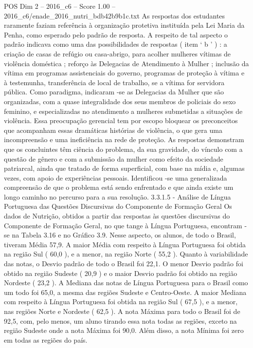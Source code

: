 \begin{textsample}{POS Dim 2 – 2016\_c6 – Score 1.00 – 2016\_c6/enade\_2016\_nutri\_bdb42b9b1c.txt}
As respostas dos estudantes raramente faziam referência à organização protetiva instituída pela Lei Maria da Penha, como esperado pelo padrão de resposta.
A respeito de tal aspecto o padrão indicava como uma das possibilidades de respostas ( item ‘ b ’ ) : a criação de casas de refúgio ou casa-abrigo, para acolher mulheres vítimas de violência doméstica ; reforço às Delegacias de Atendimento à Mulher ; inclusão da vítima em programas assistenciais do governo, programas de proteção à vítima e à testemunha, transferência de local de trabalho, se a vítima for servidora pública.
Como paradigma, indicaram -se as Delegacias da Mulher que são organizadas, com a quase integralidade dos seus membros de policiais do sexo feminino, e especializadas no atendimento a mulheres submetidas a situações de violência.
Essa preocupação gerencial tem por escopo bloquear os preconceitos que acompanham essas dramáticas histórias de violência, o que gera uma incompreensão e uma ineficiência na rede de proteção.
As respostas demonstram que os concluintes têm ciência do problema, da sua gravidade, do vínculo com a questão de gênero e com a submissão da mulher como efeito da sociedade patriarcal, ainda que tratado de forma superficial, com base na mídia e, algumas vezes, com apoio de experiências pessoais.
Identificou -se uma generalizada compreensão de que o problema está sendo enfrentado e que ainda existe um longo caminho no percurso para a sua resolução. 3.3.1.5 - Análise de Língua Portuguesa das Questões Discursivas do Componente de Formação Geral Os dados de Nutrição, obtidos a partir das respostas às questões discursivas do Componente de Formação Geral, no que tange à Língua Portuguesa, encontram -se na Tabela 3.16 e no Gráfico 3.9.
Nesse aspecto, os alunos, de todo o Brasil, tiveram Média 57,9.
A maior Média com respeito à Língua Portuguesa foi obtida na região Sul ( 60,0 ), e a menor, na região Norte ( 55,2 ).
Quanto à variabilidade das notas, o Desvio padrão de todo o Brasil foi 22,1.
O menor Desvio padrão foi obtido na região Sudeste ( 20,9 ) e o maior Desvio padrão foi obtido na região Nordeste ( 23,2 ).
A Mediana das notas de Língua Portuguesa para o Brasil como um todo foi 65,0, a mesma das regiões Sudeste e Centro-Oeste.
A maior Mediana com respeito à Língua Portuguesa foi obtida na região Sul ( 67,5 ), e a menor, nas regiões Norte e Nordeste ( 62,5 ).
A nota Máxima para todo o Brasil foi de 92,5, com, pelo menos, um aluno tirando essa nota todas as regiões, exceto na região Sudeste onde a nota Máxima foi 90,0.
Além disso, a nota Mínima foi zero em todas as regiões do país.

\end{textsample}
